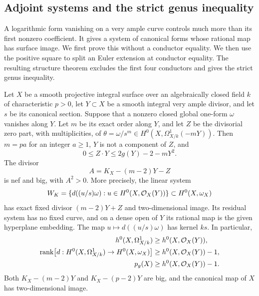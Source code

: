 \subsection{Adjoint systems and the strict genus inequality}
\label{subsec:canonical-subsystem-strictness}

A logarithmic form vanishing on a very ample curve controls much more
than its first nonzero coefficient. It gives a system of canonical
forms whose rational map has surface image. We first prove this
without a conductor equality. We then use the positive square to split an Euler extension at
conductor equality. The resulting structure theorem excludes the
first four conductors and gives the strict genus inequality.

\begin{proposition}\label{prop:residual-adjoint}
Let $X$ be a smooth projective integral surface over an algebraically
closed field $k$ of characteristic $p>0$, let $Y\subset X$ be a smooth
integral very ample divisor, and let $s$ be its canonical section.
Suppose that a nonzero closed global one-form $\omega$ vanishes along
$Y$. Let $m$ be its exact order along $Y$, and let $Z$ be the
divisorial zero part, with multiplicities, of
$\theta=\omega/s^m\in H^0(X,\Omega^1_{X/k}(-mY))$.
Then $m=pa$ for an integer $a\geq1$, $Y$ is not a component of $Z$, and
\[
 0\leq Z\cdot Y\leq 2g(Y)-2-mY^2.
\]
The divisor
\[
 A=K_X-(m-2)Y-Z
\]
is nef and big, with $A^2>0$.
More precisely, the linear system
\[
 W_K=\{d((u/s)\omega):u\in H^0(X,\mathcal O_X(Y))\}
 \subset H^0(X,\omega_X)
\]
has exact fixed divisor $(m-2)Y+Z$ and two-dimensional image.
Its residual system has no fixed curve, and on a dense open of $Y$
its rational map is the given hyperplane embedding. The map
$u\mapsto d((u/s)\omega)$ has kernel $ks$. In particular,
\begin{align*}
 h^0(X,\Omega^1_{X/k})&\geq h^0(X,\mathcal O_X(Y)),\\
 \operatorname{rank}\bigl[d:H^0(X,\Omega^1_{X/k})\to
 H^0(X,\omega_X)\bigr]&\geq h^0(X,\mathcal O_X(Y))-1,\\
 p_g(X)&\geq h^0(X,\mathcal O_X(Y))-1.
\end{align*}
Both $K_X-(m-2)Y$ and $K_X-(p-2)Y$ are big, and the canonical
map of $X$ has two-dimensional image.
\end{proposition}


